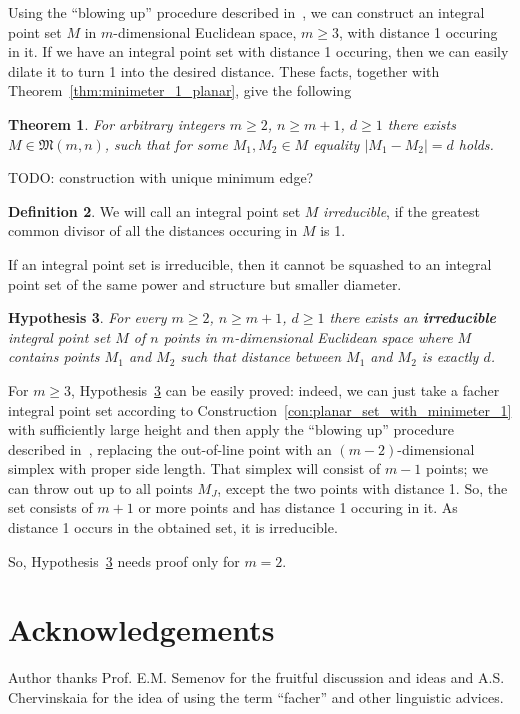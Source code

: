 \documentclass[a4paper,14pt]{article} %
\theoremstyle{plain}
\newtheorem{theorem}{Theorem}[section]
\newtheorem{hypothesis}[theorem]{Hypothesis}
\theoremstyle{definition}
\newtheorem{definition}[theorem]{Definition}
\begin{document}
Using the ``blowing up'' procedure described in~\cite[theorem 1.3]{kurz2008bounds},
we can construct an integral point set $M$ in $m$-dimensional Euclidean space, $m\geq 3$,
with distance 1 occuring in it.
If we have an integral point set with distance 1 occuring,
then we can easily dilate it to turn 1 into the desired distance.
These facts, together with Theorem~\ref{thm:minimeter_1_planar}, give the following

\begin{theorem}
	For arbitrary integers $m \geq 2$, $n \geq m+1$, $d \geq 1$
	there exists $M\in\mathfrak{M}(m,n)$,
	such that for some $M_1, M_2\in M$ equality $|M_1 - M_2| = d$ holds.
\end{theorem}

TODO: construction with unique minimum edge?

\begin{definition}
	We will call an integral point set $M$ \textit{irreducible}, if the greatest common divisor
	of all the distances occuring in $M$ is 1.
\end{definition}

If an integral point set is irreducible,
then it cannot be squashed to an integral point set of the same power and structure but smaller diameter.

\begin{hypothesis}
	\label{hyp:irreducible_planar}
	For every $m \geq 2$, $n \geq m+1$, $d \geq 1$ there exists an \textbf{irreducible}
	integral point set $M$ of $n$ points in $m$-dimensional Euclidean space
	where $M$ contains points $M_1$ and $M_2$ such that distance between $M_1$ and $M_2$ is exactly $d$.
\end{hypothesis}

For $m \geq 3$, Hypothesis~\ref{hyp:irreducible_planar} can be easily proved:
indeed, we can just take a facher integral point set according to Construction~\ref{con:planar_set_with_minimeter_1}
with sufficiently large height and then apply the ``blowing up'' procedure described in~\cite[Theorem 1.3]{kurz2008bounds},
replacing the out-of-line point with an $(m-2)$-dimensional simplex with proper side length.
That simplex will consist of $m-1$ points;
we can throw out up to all points $M_J$, except the two points with distance 1.
So, the set consists of $m+1$ or more points and has distance 1 occuring in it.
As distance 1 occurs in the obtained set, it is irreducible.

So, Hypothesis~\ref{hyp:irreducible_planar} needs proof only for $m=2$.

\section{Acknowledgements}
Author thanks Prof. E.M. Semenov for the fruitful discussion and ideas
and A.S. Chervinskaia for the idea of using the term ``facher'' and other linguistic advices.


\printbibliography
\end{document}
